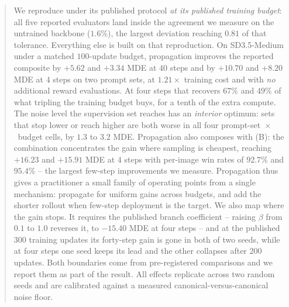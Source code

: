 \begin{abstract}
We reproduce \opsd under its published protocol \emph{at its published training budget}:
all five reported evaluators land inside the agreement we measure on the untrained backbone
($1.6\%$), the largest deviation reaching $0.81$ of that tolerance. Everything else is built
on that reproduction.
On SD3.5-Medium under a matched $100$-update budget, propagation improves the reported
composite by $+5.62$ and $+3.34$ MDE at $40$ steps and by $+10.70$ and $+8.20$ MDE at
$4$ steps on two prompt sets, at $1.21\times$ training cost and with \emph{no} additional
reward evaluations. At four steps that recovers $67\%$ and $49\%$ of what tripling the
training budget buys, for a tenth of the extra compute. The noise level the supervision set reaches has an \emph{interior}
optimum: sets that stop lower or reach higher are both worse in all four
prompt-set~$\times$~budget cells, by $1.3$ to $3.2$ MDE. Propagation also composes with (B): the combination concentrates the
gain where sampling is cheapest, reaching $+16.23$ and $+15.91$ MDE at $4$ steps with
per-image win rates of $92.7\%$ and $95.4\%$ -- the largest few-step improvements we
measure. Propagation thus gives a practitioner a small family of operating points from a
single mechanism: propagate for uniform gains across budgets, and add the shorter rollout
when few-step deployment is the target.
We also map where the gain stops. It requires the published branch coefficient -- raising
$\beta$ from $0.1$ to $1.0$ reverses it, to $-15.40$ MDE at four steps -- and at the published $300$ training updates its forty-step gain is gone in both of
two seeds, while at four steps one seed keeps its lead and the other collapses after
$200$ updates. Both boundaries come from pre-registered comparisons and we report them as part of
the result. All effects
replicate across two random seeds and are calibrated against a measured
canonical-versus-canonical noise floor.
\end{abstract}
